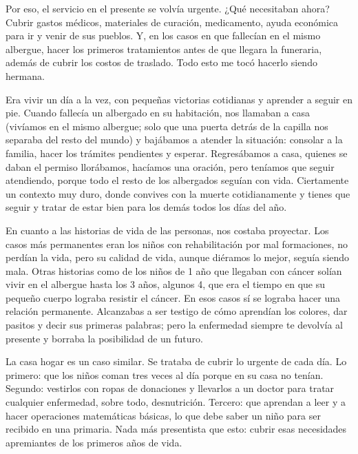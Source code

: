 \documentclass[
  spanish,
  11pt,
  a4paper,
]{scrbook}
\begin{document}
Por eso, el servicio en el presente se volvía urgente. ¿Qué necesitaban
ahora? Cubrir gastos médicos, materiales de curación, medicamento, ayuda
económica para ir y venir de sus pueblos. Y, en los casos en que
fallecían en el mismo albergue, hacer los primeros tratamientos antes de
que llegara la funeraria, además de cubrir los costos de traslado. Todo
esto me tocó hacerlo siendo hermana.

Era vivir un día a la vez, con pequeñas victorias cotidianas y aprender
a seguir en pie. Cuando fallecía un albergado en su habitación, nos
llamaban a casa (vivíamos en el mismo albergue; solo que una puerta
detrás de la capilla nos separaba del resto del mundo) y bajábamos a
atender la situación: consolar a la familia, hacer los trámites
pendientes y esperar. Regresábamos a casa, quienes se daban el permiso
llorábamos, hacíamos una oración, pero teníamos que seguir atendiendo,
porque todo el resto de los albergados seguían con vida. Ciertamente un
contexto muy duro, donde convives con la muerte cotidianamente y tienes
que seguir y tratar de estar bien para los demás todos los días del año.

En cuanto a las historias de vida de las personas, nos costaba
proyectar. Los casos más permanentes eran los niños con rehabilitación
por mal formaciones, no perdían la vida, pero su calidad de vida, aunque
diéramos lo mejor, seguía siendo mala. Otras historias como de los niños
de 1 año que llegaban con cáncer solían vivir en el albergue hasta los 3
años, algunos 4, que era el tiempo en que su pequeño cuerpo lograba
resistir el cáncer. En esos casos sí se lograba hacer una relación
permanente. Alcanzabas a ser testigo de cómo aprendían los colores, dar
pasitos y decir sus primeras palabras; pero la enfermedad siempre te
devolvía al presente y borraba la posibilidad de un futuro.

La casa hogar es un caso similar. Se trataba de cubrir lo urgente de
cada día. Lo primero: que los niños coman tres veces al día porque en su
casa no tenían. Segundo: vestirlos con ropas de donaciones y llevarlos a
un doctor para tratar cualquier enfermedad, sobre todo, desnutrición.
Tercero: que aprendan a leer y a hacer operaciones matemáticas básicas,
lo que debe saber un niño para ser recibido en una primaria. Nada más
presentista que esto: cubrir esas necesidades apremiantes de los
primeros años de vida.
\end{document}
